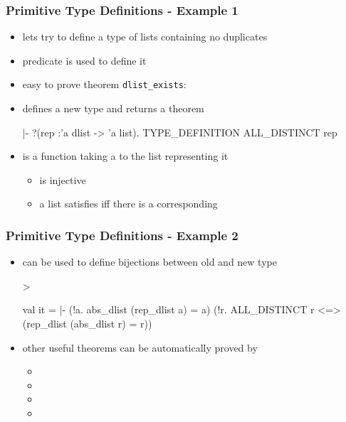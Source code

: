 \begin{frame}[fragile]
\frametitle{Primitive Type Definitions - Example 1}
\begin{itemize}
\item lets try to define a type  of lists containing no duplicates
\item predicate  is used to define it
\item easy to prove theorem \texttt{dlist\_exists}: 
\item {} defines
      a new type  and returns a theorem\bigskip
\begin{semiverbatim}
|- ?(rep :'a dlist -> 'a list).
     TYPE_DEFINITION ALL_DISTINCT rep
\end{semiverbatim}\bigskip
\item {} is a function taking a  to the list representing it
\begin{itemize}
\item {} is injective
\item a list satisfies  iff there is a corresponding 
\end{itemize}
\end{itemize}
\end{frame}


\begin{frame}[fragile]
\frametitle{Primitive Type Definitions - Example 2}
\begin{itemize}
\item {} can be used to define bijections between old and new type
\medskip
\begin{semiverbatim}\scriptsize
> 

val it =
   |- (!a. abs_dlist (rep_dlist a) = a) \holAnd{}
      (!r. ALL_DISTINCT r <=> (rep_dlist (abs_dlist r) = r))
\end{semiverbatim}\medskip
\item other useful theorems can be automatically proved by
\begin{itemize}
\item {}
\item {}
\item {}
\item {}
\end{itemize}
\end{itemize}
\end{frame}


